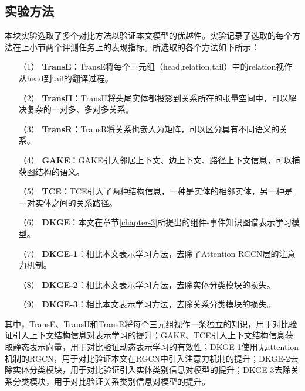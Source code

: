 \subsection{实验方法}
本块实验选取了多个对比方法以验证本文模型的优越性。实验记录了选取的每个方法在上小节两个评测任务上的表现指标。所选取的各个方法如下所示：
\begin{itemize}[itemsep=0 pt,topsep = 0 pt,parsep =0pt,partopsep=0pt]
    \item [（1）] 
    \textbf{TransE}\cite{bordes2013translatingE}：TransE将每个三元组（head,relation,tail）中的relation视作从head到tail的翻译过程。
    \item [（2）]
    \textbf{TransH}\cite{wang2014knowledge}：TransH将头尾实体都投影到关系所在的张量空间中，可以解决复杂的一对多、多对多关系。
    \item [（3）]
    \textbf{TransR}\cite{lin2015learning}：TransR将关系也嵌入为矩阵，可以区分具有不同语义的关系。
    \item [（4）]
    \textbf{GAKE}\cite{feng2016gake}：GAKE引入邻居上下文、边上下文、路径上下文信息，可以捕获图结构的语义。
    \item [（5）]
    \textbf{TCE}\cite{shi2017knowledge}：TCE引入了两种结构信息，一种是实体的相邻实体，另一种是一对实体之间的关系路径。
    \item [（6）]
    \textbf{DKGE}：本文在章节\ref{chapter-3}所提出的组件-事件知识图谱表示学习模型。
    \item [（7）]
    \textbf{DKGE-1}：相比本文表示学习方法，去除了Attention-RGCN层的注意力机制。
    \item [（8）]
    \textbf{DKGE-2}：相比本文表示学习方法，去除实体分类模块的损失。
    \item [（9）]
    \textbf{DKGE-3}：相比本文表示学习方法，去除关系分类模块的损失。
  \end{itemize}

其中，TransE、TransH和TransR将每个三元组视作一条独立的知识，用于对比验证引入上下文结构信息对表示学习的提升；GAKE、TCE引入上下文结构信息获取静态表示向量，用于对比验证动态表示学习的有效性；DKGE-1使用无attention机制的RGCN，用于对比验证本文在RGCN中引入注意力机制的提升；DKGE-2去除实体分类模块，用于对比验证引入实体类别信息对模型的提升；DKGE-3去除关系分类模块，用于对比验证关系类别信息对模型的提升。

